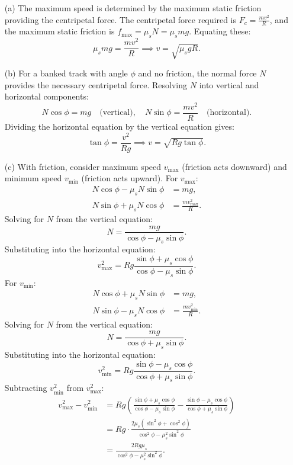 \documentclass{article}
\begin{document}
\begin{enumerate}
    \item[(a)] The maximum speed is determined by the maximum static friction providing the centripetal force. The centripetal force required is $F_c = \frac{mv^2}{R}$, and the maximum static friction is $f_{\text{max}} = \mu_s N = \mu_s mg$. Equating these:
    \[
    \mu_s mg = \frac{mv^2}{R} \implies v = \sqrt{\mu_s g R}.
    \]
    
    \item[(b)] For a banked track with angle $\phi$ and no friction, the normal force $N$ provides the necessary centripetal force. Resolving $N$ into vertical and horizontal components:
    \[
    N \cos\phi = mg \quad \text{(vertical)}, \quad N \sin\phi = \frac{mv^2}{R} \quad \text{(horizontal)}.
    \]
    Dividing the horizontal equation by the vertical equation gives:
    \[
    \tan\phi = \frac{v^2}{Rg} \implies v = \sqrt{Rg \tan\phi}.
    \]
    
    \item[(c)] With friction, consider maximum speed $v_{\text{max}}$ (friction acts downward) and minimum speed $v_{\text{min}}$ (friction acts upward). For $v_{\text{max}}$:
    \begin{align*}
        N \cos\phi - \mu_s N \sin\phi &= mg, \\
        N \sin\phi + \mu_s N \cos\phi &= \frac{mv_{\text{max}}^2}{R}.
    \end{align*}
    Solving for $N$ from the vertical equation:
    \[
    N = \frac{mg}{\cos\phi - \mu_s \sin\phi}.
    \]
    Substituting into the horizontal equation:
    \[
    v_{\text{max}}^2 = Rg \frac{\sin\phi + \mu_s \cos\phi}{\cos\phi - \mu_s \sin\phi}.
    \]
    For $v_{\text{min}}$:
    \begin{align*}
        N \cos\phi + \mu_s N \sin\phi &= mg, \\
        N \sin\phi - \mu_s N \cos\phi &= \frac{mv_{\text{min}}^2}{R}.
    \end{align*}
    Solving for $N$ from the vertical equation:
    \[
    N = \frac{mg}{\cos\phi + \mu_s \sin\phi}.
    \]
    Substituting into the horizontal equation:
    \[
    v_{\text{min}}^2 = Rg \frac{\sin\phi - \mu_s \cos\phi}{\cos\phi + \mu_s \sin\phi}.
    \]
    Subtracting $v_{\text{min}}^2$ from $v_{\text{max}}^2$:
    \begin{align*}
        v_{\text{max}}^2 - v_{\text{min}}^2 &= Rg \left( \frac{\sin\phi + \mu_s \cos\phi}{\cos\phi - \mu_s \sin\phi} - \frac{\sin\phi - \mu_s \cos\phi}{\cos\phi + \mu_s \sin\phi} \right) \\
        &= Rg \cdot \frac{2\mu_s (\sin^2\phi + \cos^2\phi)}{\cos^2\phi - \mu_s^2 \sin^2\phi} \\
        &= \frac{2Rg\mu_s}{\cos^2\phi - \mu_s^2 \sin^2\phi}.
    \end{align*}
\end{enumerate}
\end{document}
